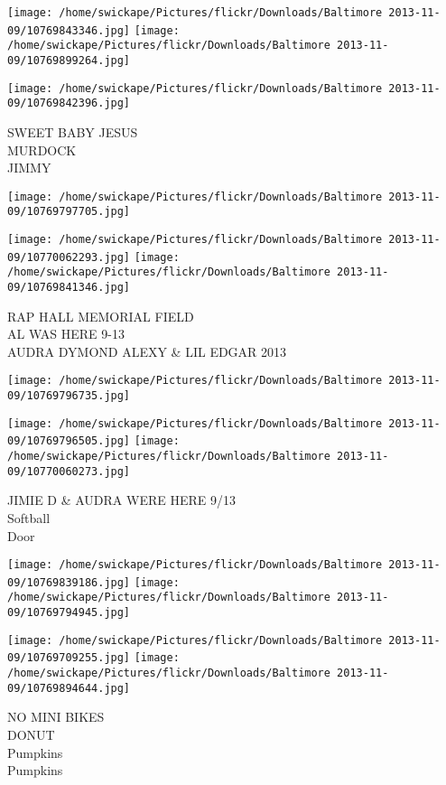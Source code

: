 \documentclass[10pt,letterpaper]{article}
\begin{document}
\texttt{[image: /home/swickape/Pictures/flickr/Downloads/Baltimore 2013-11-09/10769843346.jpg]}
\texttt{[image: /home/swickape/Pictures/flickr/Downloads/Baltimore 2013-11-09/10769899264.jpg]}

\vspace{0.25in}
\texttt{[image: /home/swickape/Pictures/flickr/Downloads/Baltimore 2013-11-09/10769842396.jpg]}

SWEET BABY JESUS\\
MURDOCK\\
JIMMY
\pagebreak

\texttt{[image: /home/swickape/Pictures/flickr/Downloads/Baltimore 2013-11-09/10769797705.jpg]}

\vspace{0.25in}
\texttt{[image: /home/swickape/Pictures/flickr/Downloads/Baltimore 2013-11-09/10770062293.jpg]}
\texttt{[image: /home/swickape/Pictures/flickr/Downloads/Baltimore 2013-11-09/10769841346.jpg]}

RAP HALL MEMORIAL FIELD\\
AL WAS HERE 9{-}13\\
AUDRA DYMOND ALEXY \& LIL EDGAR 2013
\pagebreak

\texttt{[image: /home/swickape/Pictures/flickr/Downloads/Baltimore 2013-11-09/10769796735.jpg]}

\vspace{0.25in}
\texttt{[image: /home/swickape/Pictures/flickr/Downloads/Baltimore 2013-11-09/10769796505.jpg]}
\texttt{[image: /home/swickape/Pictures/flickr/Downloads/Baltimore 2013-11-09/10770060273.jpg]}

JIMIE D \& AUDRA WERE HERE 9/13\\
Softball\\
Door
\pagebreak

\texttt{[image: /home/swickape/Pictures/flickr/Downloads/Baltimore 2013-11-09/10769839186.jpg]}
\texttt{[image: /home/swickape/Pictures/flickr/Downloads/Baltimore 2013-11-09/10769794945.jpg]}

\texttt{[image: /home/swickape/Pictures/flickr/Downloads/Baltimore 2013-11-09/10769709255.jpg]}
\texttt{[image: /home/swickape/Pictures/flickr/Downloads/Baltimore 2013-11-09/10769894644.jpg]}

NO MINI BIKES\\
DONUT\\
Pumpkins\\
Pumpkins
\pagebreak
\end{document}
